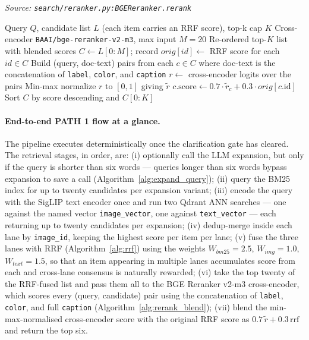 \begin{algorithm}[H]
\caption{BGE Cross-Encoder Rerank with RRF Score Blending}\label{alg:rerank_blend}
\textit{Source: \texttt{search/reranker.py:BGEReranker.rerank}}
\begin{algorithmic}[1]
\Require Query $Q$, candidate list $L$ (each item carries an RRF score), top-k cap $K$
\Require Cross-encoder \texttt{BAAI/bge-reranker-v2-m3}, max input $M=20$
\Ensure Re-ordered top-$K$ list with blended scores
    \State $C \gets L[0\!:\!M]$;\; record $orig[id] \gets$ RRF score for each $id \in C$
    \State Build (query, doc-text) pairs from each $c \in C$ where doc-text is the concatenation of \texttt{label}, \texttt{color}, and \texttt{caption}
    \State $r \gets$ cross-encoder logits over the pairs
    \State Min-max normalize $r$ to $[0,1]$ giving $\tilde r$
        \State $c.\text{score} \gets 0.7 \cdot \tilde r_c + 0.3 \cdot orig[c.\text{id}]$
    \EndFor
    \State Sort $C$ by score descending and \Return $C[0\!:\!K]$
\EndFunction
\end{algorithmic}
\end{algorithm}

\paragraph{End-to-end PATH 1 flow at a glance.}
The pipeline executes deterministically once the clarification gate has cleared. The retrieval stages, in order, are: (i) optionally call the LLM expansion, but only if the query is shorter than six words --- queries longer than six words bypass expansion to save a call (Algorithm~\ref{alg:expand_query}); (ii) query the BM25 index for up to twenty candidates per expansion variant; (iii) encode the query with the SigLIP text encoder once and run two Qdrant ANN searches --- one against the named vector \texttt{image\_vector}, one against \texttt{text\_vector} --- each returning up to twenty candidates per expansion; (iv) dedup-merge inside each lane by \texttt{image\_id}, keeping the highest score per item per lane; (v) fuse the three lanes with RRF (Algorithm~\ref{alg:rrf}) using the weights $W_{bm25}{=}2.5$, $W_{img}{=}1.0$, $W_{text}{=}1.5$, so that an item appearing in multiple lanes accumulates score from each and cross-lane consensus is naturally rewarded; (vi) take the top twenty of the RRF-fused list and pass them all to the BGE Reranker v2-m3 cross-encoder, which scores every (query, candidate) pair using the concatenation of \texttt{label}, \texttt{color}, and full \texttt{caption} (Algorithm~\ref{alg:rerank_blend}); (vii) blend the min-max-normalised cross-encoder score with the original RRF score as $0.7\,\tilde r + 0.3\,\text{rrf}$ and return the top six.

